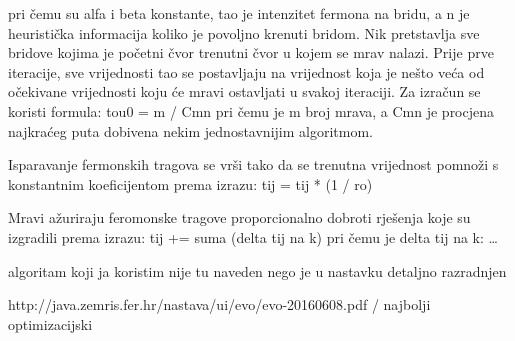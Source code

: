 pri čemu su alfa i beta konstante, tao je intenzitet fermona na bridu, a n je heuristička informacija koliko je povoljno krenuti bridom. Nik pretstavlja
sve bridove kojima je početni čvor trenutni čvor u kojem se mrav nalazi. Prije prve iteracije, sve vrijednosti tao se postavljaju na
vrijednost koja je nešto veća od očekivane vrijednosti koju će mravi ostavljati u svakoj iteraciji. Za izračun se koristi formula:
tou0 = m / Cmn
pri čemu je m broj mrava, a Cmn je procjena najkraćeg puta dobivena nekim jednostavnijim algoritmom.

Isparavanje fermonskih tragova se vrši tako da se trenutna vrijednost pomnoži s konstantnim koeficijentom prema izrazu:
tij = tij * (1 / ro)

Mravi ažuriraju feromonske tragove proporcionalno dobroti rješenja koje su izgradili prema izrazu:
tij += suma (delta tij na k)
pri čemu je delta tij na k:
\dots
























algoritam koji ja koristim nije tu naveden nego je u nastavku detaljno razradnjen

http://java.zemris.fer.hr/nastava/ui/evo/evo-20160608.pdf / najbolji optimizacijski